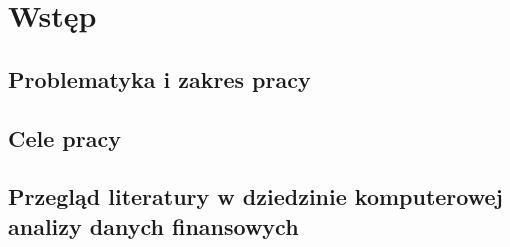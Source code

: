 \chapter{Wstęp}
\section{Problematyka i zakres pracy}
\section{Cele pracy}
\section{Przegląd literatury w dziedzinie komputerowej analizy danych finansowych}
